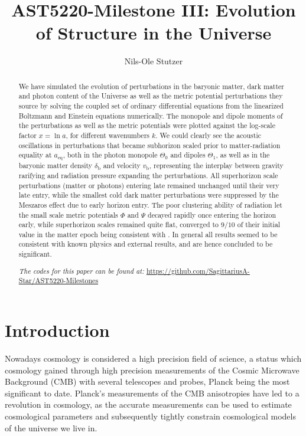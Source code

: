 \documentclass[twocolumn]{aastex62}
\begin{document}
\title{\Large AST5220-Milestone III: Evolution of Structure in the Universe}

\author{Nils-Ole Stutzer}

\begin{abstract}
    We have simulated the evolution of perturbations in the baryonic matter, dark matter and photon content of the Universe as well as the metric potential perturbations they source by solving the coupled set of ordinary differential equations from the linearized Boltzmann and Einstein equations numerically. The monopole and dipole moments of the perturbations as well as the metric potentials were plotted against the log-scale factor $x = \ln a$, for different wavenumbers $k$. We could clearly see the acoustic oscillations in perturbations that became subhorizon scaled prior to matter-radiation equality at $a_\text{eq}$, both in the photon monopole $\Theta_0$ and dipoles $\Theta_1$, as well as in the baryonic matter density $\delta_\text{b}$ and velocity $v_\text{b}$, representing the interplay between gravity rarifying and radiation pressure expanding the perturbations. All superhorizon scale perturbations (matter or photons) entering late remained unchanged until their very late entry, while the smallest cold dark matter perturbations were suppressed by the Meszaros effect due to early horizon entry. The poor clustering ability of radiation let the small scale metric potentials $\Phi$ and $\Psi$ decayed rapidly once entering the horizon early, while superhorizon scales remained quite flat, converged to $9/10$ of their initial value in the matter epoch being consistent with \cite{dodelson:2003}. In general all results seemed to be consistent with known physics and external results, and are hence concluded to be significant.


    \textit{The codes for this paper can be found at:} \newline \url{https://github.com/SagittariusA-Star/AST5220-Milestones}
\end{abstract}

\section{Introduction} \label{sec:Intro}
Nowadays cosmology is considered a high precision field of science, a status which cosmology gained through high precision measurements of the Cosmic Microwave Background (CMB) with several telescopes and probes, Planck \citep[]{planckcollaboration:2018} being the most significant to date. Planck's measurements of the CMB anisotropies have led to a revolution in cosmology, as the accurate measurements can be used to estimate cosmological parameters and subsequently tightly constrain cosmological models of the universe we live in.
\end{document}
